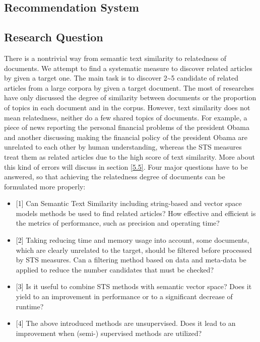 \subsection{Recommendation System}

\subsection{Research Question}

There is a nontrivial way from semantic text similarity to relatedness of documents. We attempt to find a systematic measure to discover related articles by given a target one. The main task is to discover 2\textasciitilde 5 candidate of related articles from a large corpora by given a target document. The most of researches have only discussed the degree of similarity between documents or the proportion of topics in each document and in the corpus. However, text similarity does not mean relatedness, neither do a few shared topics of documents. For example, a piece of news reporting the personal financial problems of the president Obama and another discussing making the financial policy of the president Obama are unrelated to each other by human understanding, whereas the STS measures treat them as related articles due to the high score of text similarity. More about this kind of errors will discuss in section \ref{5.5}. Four major questions have to be answered, so that achieving the relatedness degree of documents can be formulated more properly: 

\begin{itemize}
    \item[1.] \label{q:1}[1] Can Semantic Text Similarity including string-based and vector space models methods be used to find related articles? How effective and efficient is the metrics of performance, such as precision and operating time?
    \item[2.] \label{q:2}[2] Taking reducing time and memory usage into account, some documents, which are clearly unrelated to the target, should be filtered before processed by STS measures.  Can a filtering method based on data and meta-data be applied to reduce the number candidates that must be checked?
    \item[3.] \label{q:3}[3] Is it useful to combine STS methods with semantic vector space? Does it yield to an improvement in performance or to a significant decrease of runtime?
    \item[4.] \label{q:4}[4] The above introduced methods are unsupervised. Does it lead to an improvement when (semi-) supervised methods are utilized?
\end{itemize}